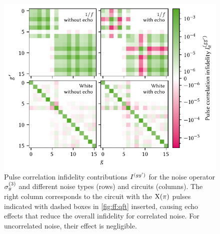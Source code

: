 \begin{figure}
    \centering
    \includegraphics{img/pdf/filter_functions/qft_correlation_infids}
    \caption[]{
        Pulse correlation infidelity contributions $I^{(gg^{\prime})}$ for the noise operator $\sigma_y^{(3)}$ and different noise types (rows) and circuits (columns).
        The right column corresponds to the circuit with the $\mathrm{X}(\pi)$ pulses indicated with dashed boxes in \cref{fig:ff:qft} inserted, causing echo effects that reduce the overall infidelity for correlated noise.
        For uncorrelated noise, their effect is negligible.
    }
    \label{fig:ff:qft:infids}
\end{figure}


